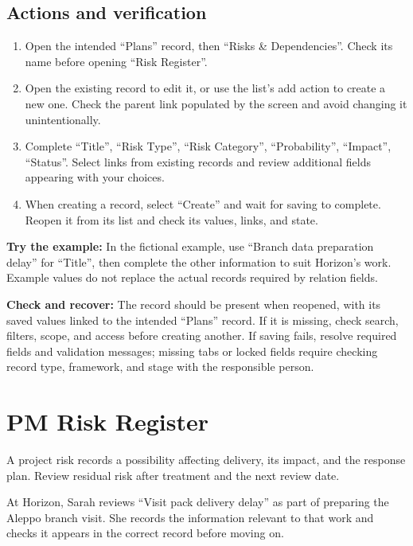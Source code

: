 \subsection{Actions and verification}
\begin{enumerate}
\item Open the intended “Plans” record, then “Risks \& Dependencies”. Check its name before opening “Risk Register”.
\item Open the existing record to edit it, or use the list's add action to create a new one. Check the parent link populated by the screen and avoid changing it unintentionally.
\item Complete “Title”, “Risk Type”, “Risk Category”, “Probability”, “Impact”, “Status”. Select links from existing records and review additional fields appearing with your choices.
\item When creating a record, select “Create” and wait for saving to complete. Reopen it from its list and check its values, links, and state.
\end{enumerate}

\textbf{Try the example:} In the fictional example, use “Branch data preparation delay” for “Title”, then complete the other information to suit Horizon's work. Example values do not replace the actual records required by relation fields.

\textbf{Check and recover:} The record should be present when reopened, with its saved values linked to the intended “Plans” record. If it is missing, check search, filters, scope, and access before creating another. If saving fails, resolve required fields and validation messages; missing tabs or locked fields require checking record type, framework, and stage with the responsible person.

\clearpage
\section{PM Risk Register}
\label{sec:projects-feature-project-risks}

A project risk records a possibility affecting delivery, its impact, and the response plan. Review residual risk after treatment and the next review date.

\begin{rcnote}
At Horizon, Sarah reviews “Visit pack delivery delay” as part of preparing the Aleppo branch visit. She records the information relevant to that work and checks it appears in the correct record before moving on.
\end{rcnote}

